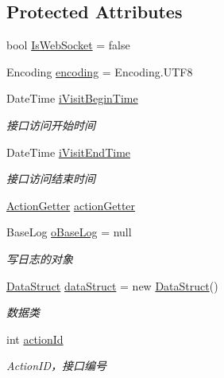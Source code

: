 \subsection*{Protected Attributes}
\begin{DoxyCompactItemize}
\item 
bool \mbox{\hyperlink{class_t_net_1_1_service_1_1_game_struct_a1284a5a13087d27443e04d1ba2027a2b}{Is\+Web\+Socket}} = false
\item 
Encoding \mbox{\hyperlink{class_t_net_1_1_service_1_1_game_struct_aefa85c66fa095eba69694bc9216e1797}{encoding}} = Encoding.\+U\+T\+F8
\item 
Date\+Time \mbox{\hyperlink{class_t_net_1_1_service_1_1_game_struct_a5ff2a2498d0a5d71f2fdb5a8a1985e75}{i\+Visit\+Begin\+Time}}
\begin{DoxyCompactList}\small\item\em 接口访问开始时间 \end{DoxyCompactList}\item 
Date\+Time \mbox{\hyperlink{class_t_net_1_1_service_1_1_game_struct_a658894f3799a80b0a13bf3ac3683b323}{i\+Visit\+End\+Time}}
\begin{DoxyCompactList}\small\item\em 接口访问结束时间 \end{DoxyCompactList}\item 
\mbox{\hyperlink{class_t_net_1_1_service_1_1_action_getter}{Action\+Getter}} \mbox{\hyperlink{class_t_net_1_1_service_1_1_game_struct_a14dcf224eb5a73e2c0b3bee4fe359dd8}{action\+Getter}}
\item 
Base\+Log \mbox{\hyperlink{class_t_net_1_1_service_1_1_game_struct_a1bc5e9e4de8cd222256db36cef31221d}{o\+Base\+Log}} = null
\begin{DoxyCompactList}\small\item\em 写日志的对象 \end{DoxyCompactList}\item 
\mbox{\hyperlink{class_t_net_1_1_service_1_1_data_struct}{Data\+Struct}} \mbox{\hyperlink{class_t_net_1_1_service_1_1_game_struct_a61214734fd0b61c58bde8f716a6690b1}{data\+Struct}} = new \mbox{\hyperlink{class_t_net_1_1_service_1_1_data_struct}{Data\+Struct}}()
\begin{DoxyCompactList}\small\item\em 数据类 \end{DoxyCompactList}\item 
int \mbox{\hyperlink{class_t_net_1_1_service_1_1_game_struct_a8c3c761a891a0da9d72d17d34a0f7446}{action\+Id}}
\begin{DoxyCompactList}\small\item\em Action\+I\+D，接口编号 \end{DoxyCompactList}\item 

\end{DoxyCompactItemize}
